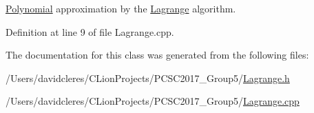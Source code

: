 \mbox{\hyperlink{class_polynomial}{Polynomial}} approximation by the \mbox{\hyperlink{class_lagrange}{Lagrange}} algorithm. 



Definition at line 9 of file Lagrange.\+cpp.



The documentation for this class was generated from the following files\+:\begin{DoxyCompactItemize}
\item 
/\+Users/davidcleres/\+C\+Lion\+Projects/\+P\+C\+S\+C2017\+\_\+\+Group5/\mbox{\hyperlink{_lagrange_8h}{Lagrange.\+h}}\item 
/\+Users/davidcleres/\+C\+Lion\+Projects/\+P\+C\+S\+C2017\+\_\+\+Group5/\mbox{\hyperlink{_lagrange_8cpp}{Lagrange.\+cpp}}\end{DoxyCompactItemize}

